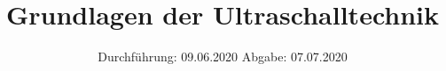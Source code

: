

\subject{901}
\title{Grundlagen der Ultraschalltechnik}
\date{%
  Durchführung: 09.06.2020
  \hspace{3em}
  Abgabe: 07.07.2020
}



\maketitle
\thispagestyle{empty}
\tableofcontents
\newpage






\nocite{V901}

\printbibliography{}


